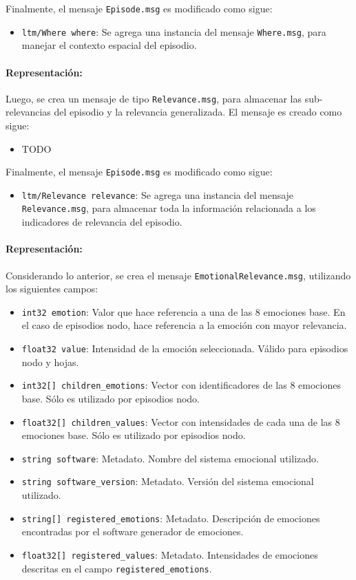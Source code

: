 Finalmente, el mensaje \texttt{Episode.msg} es modificado como sigue:
\begin{itemize}
	\item \texttt{ltm/Where where}: Se agrega una instancia del mensaje \texttt{Where.msg}, para manejar el contexto espacial del episodio.
\end{itemize}

\paragraph{Representación:}
Luego, se crea un mensaje de tipo \texttt{Relevance.msg}, para almacenar las sub-relevancias del episodio y la relevancia generalizada. El mensaje es creado como sigue:
\begin{itemize}
	\item TODO
\end{itemize}


Finalmente, el mensaje \texttt{Episode.msg} es modificado como sigue:
\begin{itemize}
	\item \texttt{ltm/Relevance relevance}: Se agrega una instancia del mensaje \texttt{Relevance.msg}, para almacenar toda la información relacionada a los indicadores de relevancia del episodio.
\end{itemize}

\paragraph{Representación:}
Considerando lo anterior, se crea el mensaje \texttt{EmotionalRelevance.msg}, utilizando los siguientes campos:
\begin{itemize}
	\item \texttt{int32 emotion}: Valor que hace referencia a una de las 8 emociones base. En el caso de episodios nodo, hace referencia a la emoción con mayor relevancia.
	\item \texttt{float32 value}: Intensidad de la emoción seleccionada. Válido para episodios nodo y hojas.
	\item \texttt{int32[] children\_emotions}: Vector con identificadores de las 8 emociones base. Sólo es utilizado por episodios nodo.
	\item \texttt{float32[] children\_values}: Vector con intensidades de cada una de las 8 emociones base. Sólo es utilizado por episodios nodo.
	\item \texttt{string software}: Metadato. Nombre del sistema emocional utilizado.
	\item \texttt{string software\_version}: Metadato. Versión del sistema emocional utilizado.
	\item \texttt{string[] registered\_emotions}: Metadato. Descripción de emociones encontradas por el software generador de emociones. 
	\item \texttt{float32[] registered\_values}: Metadato. Intensidades de emociones descritas en el campo \texttt{registered\_emotions}.
\end{itemize}

